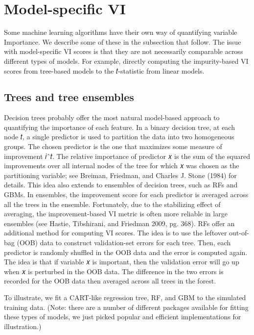 \section{Model-specific VI}

Some machine learning algorithms have their own way of quantifying variable Importance. We describe some of these in the subsection that follow. The issue with model-specific VI scores is that they are not necessarily comparable across different types of models. For example, directly computing the impurity-based VI scores from tree-based models to the 𝑡-statistic from linear models.

\subsection{Trees and tree ensembles}

Decision trees probably offer the most natural model-based approach to quantifying the importance of each feature. In a binary decision tree, at each node 𝑡, a single predictor is used to partition the data into two homogeneous groups. The chosen predictor is the one that maximizes some measure of improvement 𝑖ˆ𝑡. The relative importance of predictor 𝑥 is the sum of the squared improvements over all internal nodes of the tree for which 𝑥 was chosen as the partitioning variable; see Breiman, Friedman, and Charles J. Stone (1984) for details. This idea also extends to ensembles of decision trees, such as RFs and GBMs. In ensembles, the improvement score for each predictor is averaged across all the trees in the ensemble. Fortunately, due to the stabilizing effect of averaging, the improvement-based VI metric is often more reliable in large ensembles (see Hastie, Tibshirani, and Friedman 2009, pg. 368). RFs offer an additional method for computing VI scores. The idea is to use the leftover out-of-bag (OOB) data to construct validation-set errors for each tree. Then, each predictor is randomly shuffled in the OOB data and the error is computed again. The idea is that if variable 𝑥 is important, then the validation error will go up when 𝑥 is perturbed in the OOB data. The difference in the two errors is recorded for the OOB data then averaged across all trees in the forest.

To illustrate, we fit a CART-like regression tree, RF, and GBM to the simulated training data. (Note: there are a number of different packages available for fitting these types of models, we just picked popular and efficient implementations for illustration.)

